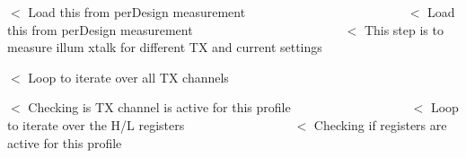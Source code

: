 $<$ Load this from per\+Design measurement ~\newline
~\newline
~\newline
~\newline
~\newline
~\newline
~\newline
~\newline
~\newline
~\newline
~\newline
~\newline
~\newline
~\newline
~\newline
 $<$ Load this from per\+Design measurement ~\newline
~\newline
~\newline
~\newline
~\newline
~\newline
~\newline
~\newline
~\newline
~\newline
~\newline
~\newline
~\newline
~\newline
 $<$ This step is to measure illum xtalk for different TX and current settings

$<$ Loop to iterate over all TX channels

$<$ Checking is TX channel is active for this profile ~\newline
~\newline
~\newline
~\newline
~\newline
~\newline
~\newline
~\newline
~\newline
~\newline
~\newline
 $<$ Loop to iterate over the H/L registers ~\newline
~\newline
~\newline
~\newline
~\newline
~\newline
~\newline
~\newline
~\newline
~\newline
 $<$ Checking if registers are active for this profile

